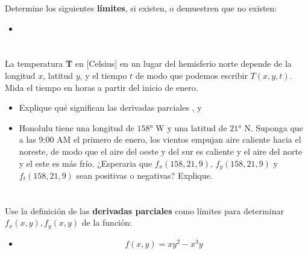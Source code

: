 \documentclass[12pt]{article}
\begin{document}
Determine los siguientes \textbf{límites}, si existen, o demuestren que no existen:

\begin{itemize}[format=\textbf]

\item

\end{itemize}

\section{}

La temperatura \textbf{T} en [Celsius] en un lugar del hemisferio norte depende de la longitud $x$, latitud $y$, y el tiempo $t$ de modo que podemos escribir $T(x, y, t)$. Mida el tiempo en horas a partir del inicio de enero.

\begin{itemize}[format=\textbf]

\item Explique qué significan las derivadas parciales , y 

\item Honolulu tiene una longitud de $158°$ W y una latitud de $21°$ N. Suponga que a las 9:00 AM el primero de enero, los vientos empujan aire caliente hacia el noreste, de modo que el aire del oeste y del sur es caliente y el aire del norte y el este es más frío. ¿Esperaria que $f_x(158, 21, 9)$, $f_y(158, 21, 9)$ y $f_t(158, 21, 9)$ sean positivas o
negativas? Explique.

\end{itemize}

\section{}

Use la definición de las \textbf{derivadas parciales} como límites para determinar $f_x(x, y), f_y(x, y)$ de la función:

\begin{itemize}[format=\textbf]

\item $$f(x, y) = xy^2 − x^3y$$

\end{itemize}
\end{document}

